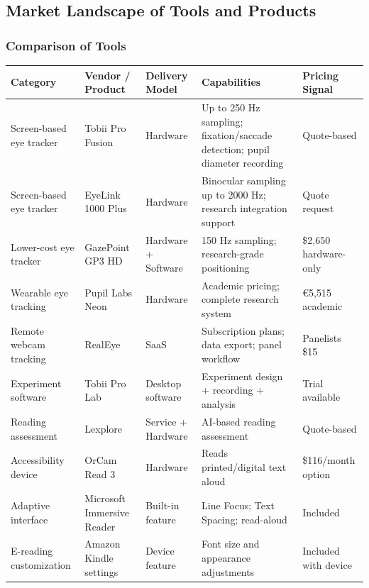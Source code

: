 \subsection{Market Landscape of Tools and Products}

\subsubsection{Comparison of Tools}

\begin{longtable}{p{3cm}p{3cm}p{2.5cm}p{4cm}p{2.5cm}}
\toprule
Category & Vendor / Product & Delivery Model & Capabilities & Pricing Signal \\
\midrule
Screen-based eye tracker & Tobii Pro Fusion & Hardware & Up to 250 Hz sampling; fixation/saccade detection; pupil diameter recording \cite{ref3} & Quote-based \cite{ref3} \\
Screen-based eye tracker & EyeLink 1000 Plus & Hardware & Binocular sampling up to 2000 Hz; research integration support \cite{ref4} & Quote request \cite{ref5} \\
Lower-cost eye tracker & GazePoint GP3 HD & Hardware + Software & 150 Hz sampling; research-grade positioning \cite{ref6} & \$2,650 hardware-only \cite{ref6} \\
Wearable eye tracking & Pupil Labs Neon & Hardware & Academic pricing; complete research system \cite{ref7} & €5,515 academic \cite{ref7} \\
Remote webcam tracking & RealEye & SaaS & Subscription plans; data export; panel workflow \cite{ref8} & Panelists \$15 \cite{ref9} \\
Experiment software & Tobii Pro Lab & Desktop software & Experiment design + recording + analysis \cite{ref10} & Trial available \cite{ref10} \\
Reading assessment & Lexplore & Service + Hardware & AI-based reading assessment \cite{ref11} & Quote-based \cite{ref12} \\
Accessibility device & OrCam Read 3 & Hardware & Reads printed/digital text aloud \cite{ref13} & \$116/month option \cite{ref13} \\
Adaptive interface & Microsoft Immersive Reader & Built-in feature & Line Focus; Text Spacing; read-aloud \cite{ref14} & Included \cite{ref14} \\
E-reading customization & Amazon Kindle settings & Device feature & Font size and appearance adjustments \cite{ref15} & Included with device \cite{ref15} \\
\bottomrule
\end{longtable}

